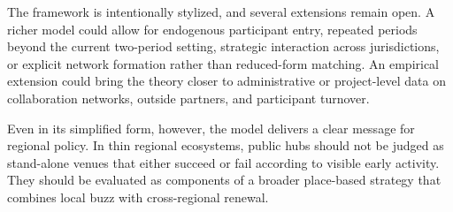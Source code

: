 The framework is intentionally stylized, and several extensions remain open. A richer model could allow for endogenous participant entry, repeated periods beyond the current two-period setting, strategic interaction across jurisdictions, or explicit network formation rather than reduced-form matching. An empirical extension could bring the theory closer to administrative or project-level data on collaboration networks, outside partners, and participant turnover.

Even in its simplified form, however, the model delivers a clear message for regional policy. In thin regional ecosystems, public hubs should not be judged as stand-alone venues that either succeed or fail according to visible early activity. They should be evaluated as components of a broader place-based strategy that combines local buzz with cross-regional renewal.
